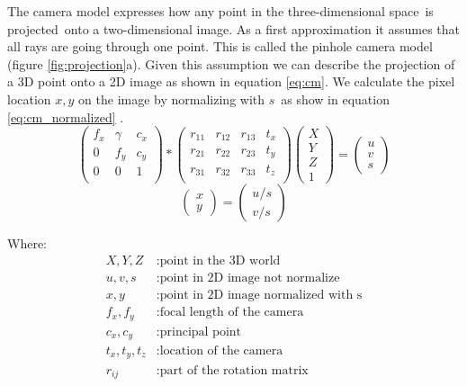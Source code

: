 \documentclass[11pt,a4paper,titlepage,oneside]{report}
\begin{document}
The camera model expresses how any point in the three-dimensional space is projected onto a two-dimensional image. As a first approximation it assumes that all rays are going through one point. This is called the pinhole camera model (figure \ref{fig:projection}a). Given this assumption we can describe the projection of a 3D point onto a 2D image as shown in equation \ref{eq:cm}. We calculate the pixel location $x,y$ on the image by normalizing with $s$ as show in equation \ref{eq:cm_normalized} \cite{rvc}.
\begin{equation}\label{eq:cm}
  \begin{pmatrix}
		f_x & \gamma & c_x \\
		0 & f_y & c_y \\
		0 & 0 & 1 \\
	\end{pmatrix}*
	\begin{pmatrix}
		r_{11} & r_{12} & r_{13} & t_x \\
		r_{21} & r_{22} & r_{23} & t_y \\
		r_{31} & r_{32} & r_{33} & t_z \\
	\end{pmatrix}
	\begin{pmatrix}
		X \\
		Y \\
		Z \\
		1
	\end{pmatrix}=
	\begin{pmatrix}
		u \\
		v \\
		s
  \end{pmatrix}
\end{equation}
\begin{equation}\label{eq:cm_normalized}
	\begin{pmatrix}
		x \\
		y
	\end{pmatrix}=
	\begin{pmatrix}
		u/s \\
		v/s 
  \end{pmatrix}
\end{equation}

Where:
\begin{align*}
  X,Y,Z			&: \text{point in the 3D world}\\
	u,v,s	   	&: \text{point in 2D image not normalize}\\
	x,y				&: \text{point in 2D image normalized with s}\\
	f_x,f_y  	&: \text{focal length of the camera}\\
  c_x,c_y  	&: \text{principal point}\\
  t_x,t_y,t_z	&: \text{location of the camera}\\
  r_{ij}	&: \text{part of the rotation matrix}
\end{align*}
\end{document}
